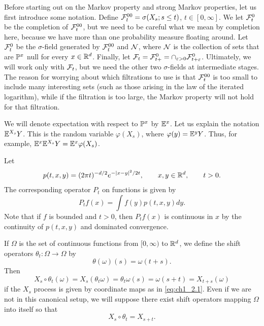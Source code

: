 
Before starting out on the Markov property and strong Markov properties, let us first introduce some notation. Define $\FC_t^{00} = \sigma(X_s; s \leq t)$, $t \in [0,\infty]$. We let $\FC_t^0$ be the completion of $\FC_t^{00}$, but we need to be careful what we mean by completion here, because we have more than one probability measure floating around. Let $\FC_t^0$ be the $\sigma$-field generated by $\FC_t^{00}$ and $\NC$, where $\NC$ is the collection of sets that are $\P^x$ null for every $x \in \R^d$. Finally, let $\FC_t = \FC_{t+}^0 = \cap_{\epsilon>0}\FC_{t+\epsilon}^0$. Ultimately, we will work only with $\FC_t$, but we need the other two $\sigma$-fields at intermediate stages. The reason for worrying about which filtrations to use is that $\FC_t^{00}$ is too small to include many interesting sets (such as those arising in the law of the iterated logarithm), while if the filtration is too large, the Markov property will not hold for that filtration.

We will denote expectation with respect to $\P^x$ by $\E^x$. Let us explain the notation $\E^{X_s}Y$. This is the random variable $\varphi(X_s)$, where $\varphi(y) = \E^y Y$. Thus, for example, $\E^x\E^{X_s}Y = \E^x\varphi(X_s)$.

Let
\begin{equation}\label{eq:ch1_3.1}
    p(t,x,y) = (2\pi t)^{-d/2}e^{-|x-y|^2/2t}, \qquad x,y \in \R^d, \qquad t > 0.
\end{equation}
The corresponding operator $P_t$ on functions is given by
\begin{equation}\label{eq:ch1_3.2}
    P_tf(x) = \int f(y)p(t,x,y)dy.
\end{equation}
Note that if $f$ is bounded and $t > 0$, then $P_tf(x)$ is continuous in $x$ by the continuity of $p(t,x,y)$ and dominated convergence.

If $\Omega$ is the set of continuous functions from $[0,\infty)$ to $\R^d$, we define the shift operators $\theta_t : \Omega \to \Omega$ by
\[
    \theta(\omega)(s) = \omega(t + s).
\]
Then
\[
    X_s \circ \theta_t(\omega) = X_s(\theta_t\omega) = \theta_t\omega(s) = \omega(s + t) = X_{t+s}(\omega)
\]
if the $X_s$ process is given by coordinate maps as in \eqref{eq:ch1_2.1}. Even if we are not in this canonical setup, we will suppose there exist shift operators mapping $\Omega$ into itself so that
\begin{equation}\label{eq:ch1_3.3}
    X_s \circ \theta_t = X_{s+t}.
\end{equation}


